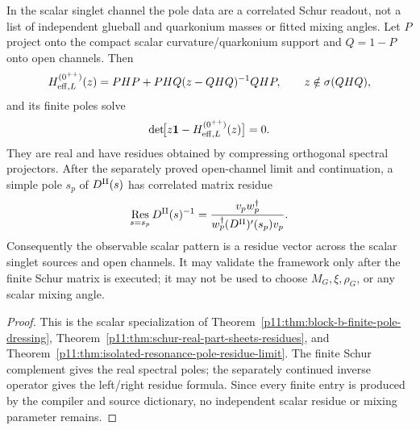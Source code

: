 \documentclass[12pt,a4paper]{article}
\begin{document}
\begin{corollary}
\label{p11:cor:scalar-glue-correlated-residue-validation-target}
In the scalar singlet channel the pole data are a correlated Schur readout,
not a list of independent glueball and quarkonium masses or fitted mixing angles.
Let \(P\) project onto the compact scalar curvature/quarkonium support and \(Q=1-P\) onto open channels.  Then
\begin{equation}
\label{p11:eq:scalar-glue-effective-hamiltonian-signature}
H_{{\rm eff},L}^{(0^{++})}(z)=PHP+PHQ(z-QHQ)^{-1}QHP,
\qquad z\notin\sigma(QHQ),
\end{equation}
and its finite poles solve
\begin{equation}
\label{p11:eq:scalar-glue-signature-pole-equation}
\det\!\bigl[z\mathbf1-H_{{\rm eff},L}^{(0^{++})}(z)\bigr]=0.
\end{equation}
They are real and have residues obtained by compressing orthogonal spectral
projectors.  After the separately
proved open-channel limit and continuation, a simple pole \(s_p\) of
\(D^{\rm II}(s)\) has correlated matrix residue
\begin{equation}
\label{p11:eq:scalar-glue-correlated-residues-signature}
\operatorname*{Res}_{s=s_p}D^{\rm II}(s)^{-1}
=\frac{v_pw_p^\dagger}{w_p^\dagger(D^{\rm II})'(s_p)v_p}.
\end{equation}
Consequently the observable scalar pattern is a residue vector across the scalar
singlet sources and open channels.  It may validate the framework only after the
finite Schur matrix is executed; it may not be used to choose \(M_G,\xi,\rho_G\), or any scalar mixing angle.
\end{corollary}
\begin{proof}
This is the scalar specialization of
Theorem~\ref{p11:thm:block-b-finite-pole-dressing},
Theorem~\ref{p11:thm:schur-real-part-sheets-residues}, and
Theorem~\ref{p11:thm:isolated-resonance-pole-residue-limit}.  The finite Schur
complement gives the real spectral poles; the separately continued inverse
operator gives the left/right residue formula.  Since every finite entry is
produced by the compiler and source dictionary, no independent scalar residue
or mixing parameter remains.
\end{proof}
\end{document}
